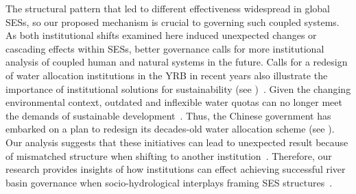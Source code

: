 The structural pattern that led to different effectiveness widespread in global SESs, so our proposed mechanism is crucial to governing such coupled systems.
As both institutional shifts examined here induced unexpected changes or cascading effects within SESs, better governance calls for more institutional analysis of coupled human and natural systems in the future.
Calls for a redesign of water allocation institutions in the YRB in recent years also illustrate the importance of institutional solutions for sustainability (see \textit{})~\cite{yu2019, niu2022}.
Given the changing environmental context, outdated and inflexible water quotas can no longer meet the demands of sustainable development~\cite{wang2019a}.
Thus, the Chinese government has embarked on a plan to redesign its decades-old water allocation scheme (see \textit{}).
Our analysis suggests that these initiatives can lead to unexpected result because of mismatched structure when shifting to another institution~\cite{bodin2017b}.
Therefore, our research provides insights of how institutions can effect achieving successful river basin governance when socio-hydrological interplays framing  SES structures~\cite{muneepeerakul2017, leslie2015, hegwood2022}.
